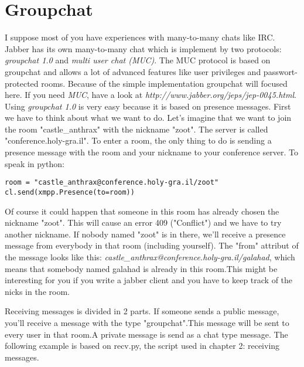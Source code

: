 \section{Groupchat}

I suppose most of you have experiences with many-to-many chats like IRC. Jabber has its own many-to-many chat which is implement by two protocols: \textit{groupchat 1.0} and \textit{multi user chat (MUC)}.
The MUC protocol is based on groupchat and allows a lot of advanced features like user privileges and passwort-protected rooms.
Because of the simple implementation groupchat will focused here.
If you need \textit{MUC}, have a look at \textit{http://www.jabber.org/jeps/jep-0045.html}.
\newline
\newline
Using \textit{groupchat 1.0} is very easy because it is based on presence messages.
First we have to think about what we want to do. Let's imagine that we want to join the room "castle\_anthrax" with the nickname "zoot". The server is called "conference.holy-gra.il".
To enter a room, the only thing to do is sending a presence message with the room and your nickname to your conference server.
\newline
To speak in python:
\begin{verbatim}
room = "castle_anthrax@conference.holy-gra.il/zoot"
cl.send(xmpp.Presence(to=room))
\end{verbatim}
Of course it could happen that someone in this room has already chosen the nickname "zoot". This will cause an error 409 ("Conflict") and we have to try another nickname.
\newline
If nobody named "zoot" is in there, we'll receive a presence message from everybody in that room (including yourself).
The "from" attribut of the message looks like this: \textit{castle\_anthrax@conference.holy-gra.il/galahad}, which means that somebody named galahad is already in this room.This might be interesting for you if you write a jabber client and you have to keep track of the nicks in the room.
\newline

Receiving messages is divided in 2 parts. If someone sends a public message, you'll receive a message with the type "groupchat".This message will be sent to every user in that room.A private message is send as a chat type message.
\newline
\newline
The following example is based on recv.py, the script used in chapter 2: receiving messages.

